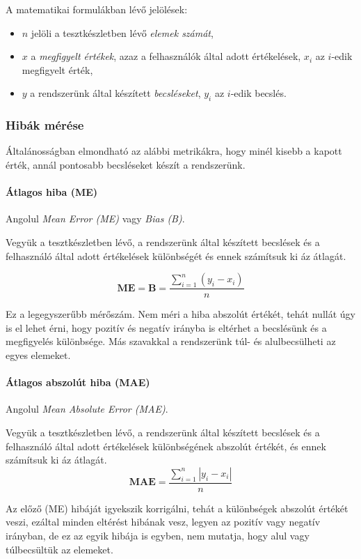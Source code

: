 \documentclass[
]{thesis-ekf}
\theoremstyle{definition}
\theoremstyle{remark}
\begin{document}
A matematikai formulákban lévő jelölések:
\begin{itemize}
	\item  $n$ jelöli a tesztkészletben lévő \emph{elemek számát},
	\item $x$ a \emph{megfigyelt értékek}, azaz a felhasználók által adott értékelések, $x_{i}$ az $i$-edik megfigyelt érték,
	\item $y$ a rendszerünk által készített \emph{becsléseket}, $y_{i}$ az $i$-edik becslés.
\end{itemize}

\subsubsection{Hibák mérése}
Általánosságban elmondható az alábbi metrikákra, hogy  minél kisebb a kapott érték, annál pontosabb becsléseket készít a rendszerünk.
\paragraph{Átlagos hiba (ME)}
Angolul \emph{Mean Error (ME)} vagy \emph{Bias (B)}.

Vegyük a tesztkészletben lévő, a rendszerünk által készített becslések és a felhasználó által adott értékelések különbségét és ennek számítsuk ki áz átlagát.

\[ \mathbf{ME} = \mathbf{B} =  \frac{\sum^{n}_{i=1}(y_{i}-x_{i})}{n}\]

Ez a legegyszerűbb mérőszám. Nem méri a hiba abszolút értékét, tehát nullát úgy is el lehet érni, hogy pozitív és negatív irányba is eltérhet a becslésünk és a megfigyelés különbsége. Más szavakkal a rendszerünk túl- és alulbecsülheti az egyes elemeket.

\paragraph{Átlagos abszolút hiba (MAE)} 
Angolul \emph{Mean Absolute Error (MAE)}.

Vegyük a tesztkészletben lévő, a rendszerünk által készített becslések és a felhasználó által adott értékelések különbségének abszolút értékét, és ennek számítsuk ki áz átlagát.
\[ \mathbf{MAE} = \frac{\sum^{n}_{i=1}\left | y_{i}-x_{i}\right |}{n} \]

Az előző (ME) hibáját igyekszik korrigálni, tehát a különbségek abszolút értékét veszi, ezáltal minden eltérést hibának vesz, legyen az pozitív vagy negatív irányban, de ez az egyik hibája is egyben, nem mutatja, hogy alul vagy túlbecsültük az elemeket.
\end{document}
